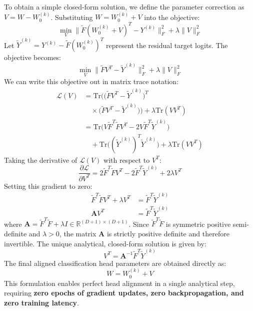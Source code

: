 \documentclass{article}
\theoremstyle{plain}
\theoremstyle{definition}
\theoremstyle{remark}
\begin{document}
To obtain a simple closed-form solution, we define the parameter correction as $V = W - W_0^{(k)}$. Substituting $W = W_0^{(k)} + V$ into the objective:
\begin{equation}
    \min_{V} \|\tilde{F} (W_0^{(k)} + V)^T - Y^{(k)}\|^2_F + \lambda \|V\|^2_F
\end{equation}
Let $\tilde{Y}^{(k)} = Y^{(k)} - \tilde{F} (W_0^{(k)})^T$ represent the residual target logits. The objective becomes:
\begin{equation}
    \min_{V} \|\tilde{F} V^T - \tilde{Y}^{(k)}\|^2_F + \lambda \|V\|^2_F
\end{equation}
We can write this objective out in matrix trace notation:
\begin{align}
    \mathcal{L}(V) &= \text{Tr}\Big( \big(\tilde{F} V^T - \tilde{Y}^{(k)}\big)^T \nonumber \\
    &\quad \times \big(\tilde{F} V^T - \tilde{Y}^{(k)}\big) \Big) + \lambda \text{Tr}(V V^T) \nonumber \\
    &= \text{Tr}\Big( V \tilde{F}^T \tilde{F} V^T - 2 V \tilde{F}^T \tilde{Y}^{(k)} \Big) \nonumber \\
    &\quad + \text{Tr}\Big( (\tilde{Y}^{(k)})^T \tilde{Y}^{(k)} \Big) + \lambda \text{Tr}(V V^T)
\end{align}
Taking the derivative of $\mathcal{L}(V)$ with respect to $V^T$:
\begin{equation}
    \frac{\partial \mathcal{L}}{\partial V^T} = 2 \tilde{F}^T \tilde{F} V^T - 2 \tilde{F}^T \tilde{Y}^{(k)} + 2 \lambda V^T
\end{equation}
Setting this gradient to zero:
\begin{align}
    \tilde{F}^T \tilde{F} V^T + \lambda V^T &= \tilde{F}^T \tilde{Y}^{(k)} \\
    \mathbf{A} V^T &= \tilde{F}^T \tilde{Y}^{(k)}
\end{align}
where $\mathbf{A} = \tilde{F}^T \tilde{F} + \lambda I \in \mathbb{R}^{(D+1) \times (D+1)}$. Since $\tilde{F}^T \tilde{F}$ is symmetric positive semi-definite and $\lambda > 0$, the matrix $\mathbf{A}$ is strictly positive definite and therefore invertible. The unique analytical, closed-form solution is given by:
\begin{equation}
    V^T = \mathbf{A}^{-1} \tilde{F}^T \tilde{Y}^{(k)}
\end{equation}
The final aligned classification head parameters are obtained directly as:
\begin{equation}
    W = W_0^{(k)} + V
\end{equation}
This formulation enables perfect head alignment in a single analytical step, requiring \textbf{zero epochs of gradient updates, zero backpropagation, and zero training latency}.
\end{document}
